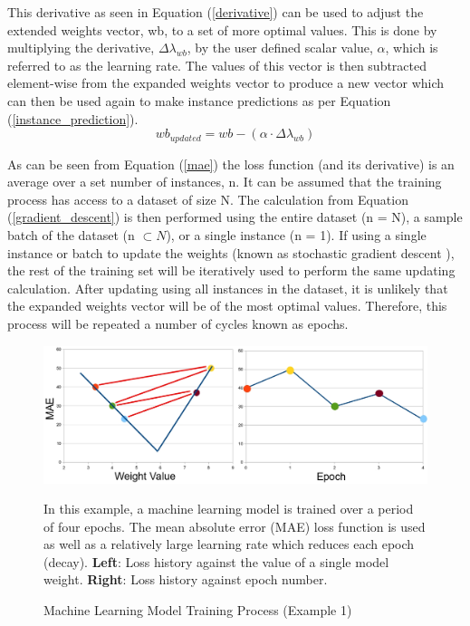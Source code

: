 \noindent
This derivative as seen in Equation (\ref{derivative}) can be used to adjust the extended weights vector, wb, to a set of more optimal values. This is done by multiplying the derivative, $\Delta\lambda_{wb}$, by the user defined scalar value, $\alpha$, which is referred to as the learning rate. The values of this vector is then subtracted element-wise from the expanded weights vector to produce a new vector which can then be used again to make instance predictions as per Equation (\ref{instance_prediction}). \\
 
 \begin{equation} \label{gradient_descent}
 	wb_{updated} = wb - (\alpha \cdot \Delta\lambda_{wb})
 \end{equation}
 
 \noindent
As can be seen from Equation (\ref{mae}) the loss function (and its derivative) is an average over a set number of instances, n. It can be assumed that the training process has access to a dataset of size N.  The calculation from Equation (\ref{gradient_descent}) is then performed using the entire dataset (n = N), a sample batch of the dataset (n $\subset N$), or a single instance (n = 1). If using a single instance or batch to update the weights (known as stochastic gradient descent \cite{ketkar2017stochastic}), the rest of the training set will be iteratively used to perform the same updating calculation. After updating using all instances in the dataset, it is unlikely that the expanded weights vector will be of the most optimal values.  Therefore, this process will be repeated a number of cycles known as epochs.

\begin{figure}[h]
	\centering
	\includegraphics[scale=0.35]{Figures/gradientDescent_mae_bigLR.jpg}
	\caption{Machine Learning Model Training Process (Example 1)} {In this example, a machine learning model is trained over a period of four epochs. The mean absolute error (MAE) loss function is used as well as a relatively large learning rate which reduces each epoch (decay). \textbf{Left}: Loss history against the value of a single model weight.  \textbf{Right}: Loss history against epoch number.}
	\label{fig:GD_maeBigLR}
\end{figure}

